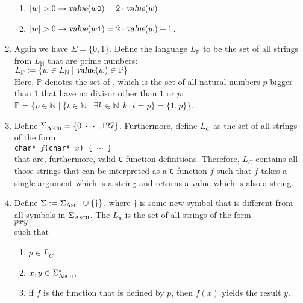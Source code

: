 \begin{enumerate}
\begin{enumerate}
      \item $|w| > 0 \rightarrow \textsl{value}(w\mathtt{0}) = 2 \cdot \textsl{value}(w)   $,
      \item $|w| > 0 \rightarrow \textsl{value}(w\mathtt{1}) = 2 \cdot \textsl{value}(w) + 1$.
      \end{enumerate}
\item Again we have $\Sigma = \{0,1\}$. Define the language $L_\mathbb{P}$
      to be the set of all strings from $L_\mathbb{N}$ that are prime numbers:
      \\[0.2cm]
      \hspace*{1.3cm}
      $L_\mathbb{P} := \{ w \in L_\mathbb{N} \mid \textsl{value}(w) \in \mathbb{P} \}$
      \\[0.2cm]
      Here, $\mathbb{P}$ denotes the set of ,  which is the set of all natural
      numbers $p$ bigger than $1$ that have no divisor other than $1$ or $p$:
      \\[0.2cm]
      \hspace*{1.3cm}
      $\mathbb{P} = \bigl\{ p \in \mathbb{N} \;\big|\; \{ t \in \mathbb{N} \mid \exists k \in
      \mathbb{N} : k \cdot t = p \} = \{1, p\} \bigr\}$.
\item Define $\Sigma_{\textsc{\scriptsize Ascii}} = \{ 0, \cdots, 127\}$.  Furthermore, define $L_C$
      as the set of all strings of the form
      \\[0.2cm]
      \hspace*{1.3cm}
      \texttt{char* $f$(char* $x$) \{ $\cdots$ \}}
      \\[0.2cm]
      that are, furthermore, valid \texttt{C} function definitions.
      Therefore,  $L_C$ contains all those strings that can be interpreted as a \texttt{C} function $f$
      such that $f$ takes a single argument which is a string and returns a value which is also a
      string.
\item Define $\Sigma := \Sigma_{\textsc{\scriptsize Ascii}} \cup \{\dag\}$, where
      $\mathtt{\dag}$ is some new symbol that is different from all symbols in
      $\Sigma_{\textsc{\scriptsize Ascii}}$.
      The   $L_u$ is the set of all strings of the form
      \\[0.2cm]
      \hspace*{1.3cm}
      $p$\dag$x$\dag$y$
      \\[0.2cm]
      such that
      \begin{enumerate}
      \item $p \in L_C$,
      \item $x,y \in \Sigma_{\textsc{Ascii}}^*$,
      \item if $f$ is the function that is defined by $p$, then $f(x)$ yields the result $y$.
            \eox
      \end{enumerate}
    \end{enumerate}

